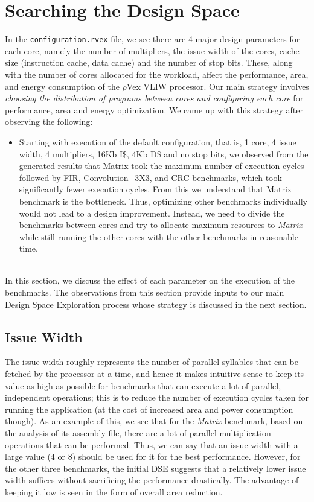 \documentclass[conference]{IEEEtran}
\begin{document}
\section{Searching the Design Space}
\label{sec:theory}
In the \texttt{configuration.rvex} file, we see there are 4 major
design parameters for each core, namely the number of multipliers, the issue width of the cores, cache size (instruction cache, data cache) and the number of stop bits. These, along with the number of cores allocated for the workload, affect the performance, area, and energy consumption of the $\rho$Vex VLIW processor. Our main strategy involves \textit{choosing the distribution of programs between cores and configuring each core} for performance, area and energy optimization. We came up with this strategy after observing the following:
\begin{itemize}
    \item Starting with execution of the default configuration, that is, 1 core, 4 issue width, 4 multipliers, 16Kb I\$, 4Kb D\$ and no stop bits, we observed from the generated results that Matrix took the maximum number of execution cycles followed by FIR, Convolution\_3X3, and CRC benchmarks, which took significantly fewer execution cycles. From this we understand that Matrix benchmark is the bottleneck. Thus, optimizing other benchmarks individually would not lead to a design improvement. Instead, we need to divide the benchmarks between cores and try to allocate maximum resources to \textit{Matrix} while still running the other cores with the other benchmarks in reasonable time.
\end{itemize}
\\
In this section, we discuss the effect of each parameter on the execution of the benchmarks. The observations from this section provide inputs to our main Design Space Exploration process whose strategy is discussed in the next section.
\subsection{Issue Width}
The issue width roughly represents the number of parallel syllables that can be fetched by the processor at a time, and hence it makes intuitive sense to keep its value as high as possible for benchmarks that can execute a lot of parallel, independent operations; this is to reduce the number of execution cycles taken for running the application (at the cost of increased area and power consumption though). As an example of this, we see that for the \textit{Matrix} benchmark, based on the analysis of its assembly file, there are a lot of parallel multiplication operations that can be performed. Thus, we can say that an issue width with a large value (4 or 8) should be used for it for the best performance. However, for the other three benchmarks, the initial DSE suggests that a relatively lower issue width suffices without sacrificing the performance drastically. The advantage of keeping it low is seen in the form of overall area reduction.
\end{document}
